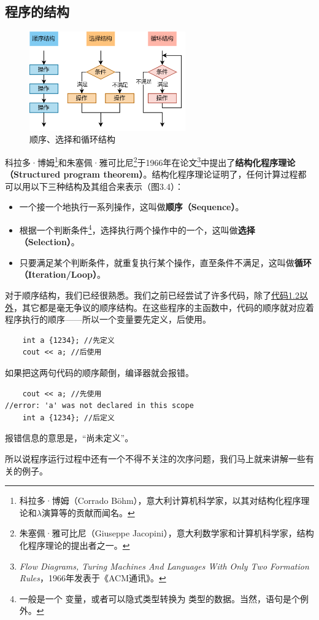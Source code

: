 \subsection*{程序的结构}
\begin{figure}[htbp]
    \centering
    \includegraphics[width=0.6\textwidth]{../images/generalized_parts/03_structured_program_theorem.drawio.png}
    \caption{顺序、选择和循环结构}
\end{figure}
科拉多·博姆\footnote{科拉多·博姆（Corrado Böhm），意大利计算机科学家，以其对结构化程序理论和$\!\lambda\!$演算等的贡献而闻名。}和朱塞佩·雅可比尼\footnote{朱塞佩·雅可比尼（Giuseppe Jacopini），意大利数学家和计算机科学家，结构化程序理论的提出者之一。}于1966年在论文\footnote{\textit{Flow Diagrams, Turing Machines And Languages With Only Two Formation Rules}，1966年发表于《ACM通讯》。}中提出了\textbf{结构化程序理论（Structured program theorem）}。结构化程序理论证明了，任何计算过程都可以用以下三种结构及其组合来表示（图3.4）：
\begin{itemize}
    \item 一个接一个地执行一系列操作，这叫做\textbf{顺序（Sequence）}。
    \item 根据一个判断条件\footnote{一般是一个 \lstinline@bool@ 变量，或者可以隐式类型转换为 \lstinline@bool@ 类型的数据。当然，\lstinline@switch@ 语句是个例外。}，选择执行两个操作中的一个，这叫做\textbf{选择（Selection）}。
    \item 只要满足某个判断条件，就重复执行某个操作，直至条件不满足，这叫做\textbf{循环（Iteration/Loop）}。
\end{itemize}
对于顺序结构，我们已经很熟悉。我们之前已经尝试了许多代码，除了\hyperref[lst:standard_and_compiler]{代码1.2以外}，其它都是毫无争议的顺序结构。在这些程序的主函数中，代码的顺序就对应着程序执行的顺序——所以一个变量要先定义，后使用。
\begin{lstlisting}
    int a {1234}; //先定义
    cout << a; //后使用
\end{lstlisting}
如果把这两句代码的顺序颠倒，编译器就会报错。
\begin{lstlisting}
    cout << a; //先使用
//error: 'a' was not declared in this scope
    int a {1234}; //后定义
\end{lstlisting}
报错信息的意思是，``\lstinline@a@ 尚未定义''。\par
所以说程序运行过程中还有一个不得不关注的次序问题，我们马上就来讲解一些有关的例子。\par
